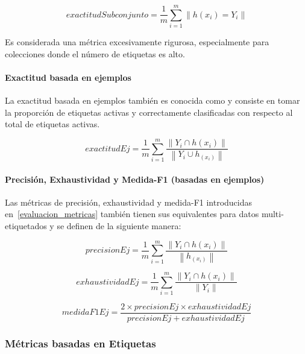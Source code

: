 \begin{equation}
	exactitudSubconjunto = \frac{1}{m} \sum_{i=1}^{m} \left\|h(x_{i}) =
	Y_{i}\right\|
\end{equation}

Es considerada una métrica excesivamente rigurosa, especialmente para
colecciones donde el número de etiquetas es alto.

\paragraph{Exactitud basada en ejemplos}

La exactitud basada en ejemplos también es conocida como  y consiste en tomar la proporción de etiquetas activas y correctamente
clasificadas con respecto al total de etiquetas activas.

\begin{equation}
	exactitudEj = \frac{1}{m} \sum_{i=1}^{m}
	\frac{\left\|Y_{i} \cap h(x_{i})\right\|}
	{\left\|Y_{i} \cup h_(x_{i})\right\|}
\end{equation}


\paragraph{Precisión, Exhaustividad y Medida-F1 (basadas en ejemplos)}

Las métricas de precisión, exhaustividad y medida-F1 introducidas
en~\ref{evaluacion_metricas} también tienen sus equivalentes para datos
multi-etiquetados y se definen de la siguiente manera:

\begin{equation}
	precisionEj = \frac{1}{m} \sum_{i=1}^{m}
	\frac{\left\|Y_{i} \cap h(x_{i})\right\|}
	{\left\|h_(x_{i})\right\|}
\end{equation}

\begin{equation}
	exhaustividadEj = \frac{1}{m} \sum_{i=1}^{m}
	\frac{\left\|Y_{i} \cap h(x_{i})\right\|}
	{\left\|Y_{i}\right\|}
\end{equation}

\begin{equation}
	medidaF1Ej = \frac{2 \times precisionEj \times exhaustividadEj}
	{precisionEj + exhaustividadEj }
\end{equation}


\subsubsection{Métricas basadas en Etiquetas}

